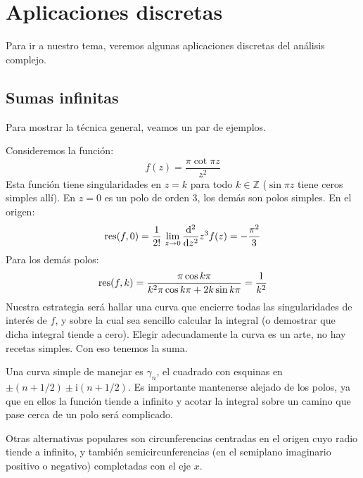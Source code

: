 \section{Aplicaciones discretas}
\label{sec:complex-discrete-applications}

  Para ir a nuestro tema,
  veremos algunas aplicaciones discretas del análisis complejo.

\subsection{Sumas infinitas}
\label{sec:complex-infinite-sums}

  Para mostrar la técnica general,
  veamos un par de ejemplos.

  Consideremos la función:
  \begin{equation*}
    f(z)
      = \frac{\pi \cot \pi z}{z^2}
  \end{equation*}
  Esta función tiene singularidades en \(z = k\)
  para todo \(k \in \mathbb{Z}\)
  (\(\sin \pi z\) tiene ceros simples allí).
  En \(z = 0\) es un polo de orden 3,
  los demás son polos simples.
  En el origen:
  \begin{equation*}
    \operatorname{res}(f, 0)
      = \frac{1}{2!} \,
	  \lim_{z \rightarrow 0}
	    \frac{\mathrm{d}^2}{\mathrm{d} z^2} z^3 f(z)
      = - \frac{\pi^2}{3}
  \end{equation*}
  Para los demás polos:
  \begin{equation*}
    \operatorname{res}(f, k)
      = \frac{\pi \cos k \pi}{k^2 \pi \cos k \pi + 2 k \sin k \pi}
      = \frac{1}{k^2}
  \end{equation*}
  Nuestra estrategia será hallar una curva
  que encierre todas las singularidades de interés de \(f\),
  y sobre la cual sea sencillo calcular la integral
  (o demostrar que dicha integral tiende a cero).
  Elegir adecuadamente la curva es un arte,
  no hay recetas simples.
  Con eso tenemos la suma.

  Una curva simple de manejar es \(\gamma_n\),
  el cuadrado
  con esquinas en \(\pm (n + 1/2) \pm \mathrm{i}(n + 1/2)\).
  Es importante mantenerse alejado de los polos,
  ya que en ellos la función tiende a infinito
  y acotar la integral sobre un camino que pase cerca de un polo
  será complicado.

  Otras alternativas populares
  son circunferencias centradas en el origen
  cuyo radio tiende a infinito,
  y también semicircunferencias
  (en el semiplano imaginario positivo o negativo)
  completadas con el eje \(x\).

